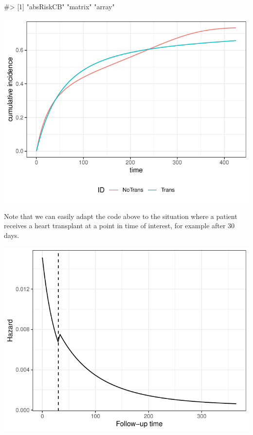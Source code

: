 \documentclass[
]{jss}
\begin{document}
\begin{CodeChunk}

\begin{CodeOutput}
#> [1] "absRiskCB" "matrix"    "array"
\end{CodeOutput}


\begin{center}\includegraphics[width=\textwidth,keepaspectratio=true]{../figures/stanford-risk-1} \end{center}

\end{CodeChunk}

Note that we can easily adapt the code above to the situation where a
patient receives a heart transplant at a point in time of interest, for
example after 30 days.

\begin{CodeChunk}


\begin{center}\includegraphics[width=\textwidth,keepaspectratio=true]{../figures/stanford-1y-haz-1} \end{center}

\end{CodeChunk}
\end{document}
